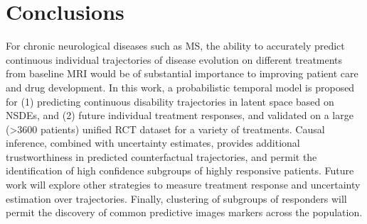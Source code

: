 \documentclass[runningheads]{llncs}
\begin{document}
\section{Conclusions}
For chronic neurological diseases such as MS, the ability to accurately predict continuous individual trajectories of disease evolution on different treatments from baseline MRI would be of substantial importance to improving patient care and drug development. In this work, a probabilistic temporal model is proposed for (1) predicting continuous disability trajectories in latent space based on NSDEs, and (2)  future individual treatment responses, and validated on a large (>3600 patients) unified RCT dataset for a variety of treatments. Causal inference, combined with uncertainty estimates, provides additional trustworthiness in predicted counterfactual trajectories, and permit the identification of high confidence subgroups of highly responsive patients. Future work will explore other strategies to measure treatment response and uncertainty estimation over trajectories. Finally, clustering of subgroups of responders will permit the discovery of common predictive images markers across the population.

\newpage


\end{document}
